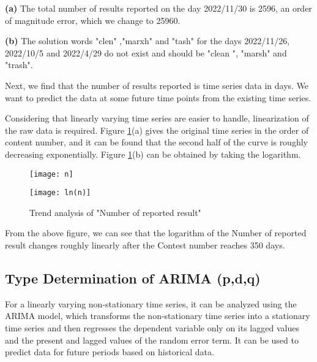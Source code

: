 \documentclass[12pt]{mcmthesis}
\begin{document}
\textbf{(a)} The total number of results reported on the day 2022/11/30 is 2596, an order of magnitude error, which we change to 25960.

\textbf{(b)} The solution words "clen" ,"marxh" and "tash" for the days 2022/11/26, 2022/10/5 and 2022/4/29 do not exist and should be "clean ", "marsh" and "trash".

Next, we find that the number of results reported is time series data in days. We want to predict the data at some future time points from the existing time series.

Considering that linearly varying time series are easier to handle, linearization of the raw data is required. Figure \ref{fig:2}(a) gives the original time series in the order of content number, and it can be found that the second half of the curve is roughly decreasing exponentially. Figure \ref{fig:2}(b) can be obtained by taking the logarithm.
\begin{figure}[h]
	\centering
	\begin{minipage}[c]{0.48\textwidth}
		\centering
		\texttt{[image: n]}
		\label{fig2_1}
	\end{minipage}
	\begin{minipage}[c]{0.49\textwidth}
		\centering
		\texttt{[image: ln(n)]}
		\label{fig2_2}
	\end{minipage}
	\caption{Trend analysis of "Number of reported result"}
	\label{fig:2}
\end{figure}

From the above figure, we can see that the logarithm of the Number of reported result changes roughly linearly after the Contest number reaches 350 days.
\\[0.01pt]
\subsection{Type Determination of ARIMA (p,d,q)}
\hspace{1.4em}For a linearly varying non-stationary time series, it can be analyzed using the ARIMA model, which transforms the non-stationary time series into a stationary time series and then regresses the dependent variable only on its lagged values and the present and lagged values of the random error term\cite{1}. It can be used to predict data for future periods based on historical data. 
\end{document}
